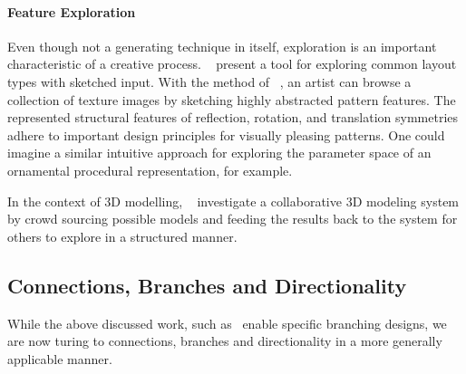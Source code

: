 \paragraph*{Feature Exploration}
\label{para:analysis_rulebased_exploration}

Even though not a generating technique in itself, exploration is an important characteristic of a creative process. \citeauthor*{todi_2016_sse}~\cite{todi_2016_sse} present a tool for exploring common layout types with sketched input. With the method of \citeauthor*{chen_2016_msi}~\cite{chen_2016_msi}, an artist can browse a collection of texture images by sketching highly abstracted pattern features. The represented structural features of reflection, rotation, and translation symmetries adhere to important design principles for visually pleasing patterns. One could imagine a similar intuitive approach for exploring the parameter space of an ornamental procedural representation, for example.

In the context of 3D modelling, \citeauthor*{talton_2009_emw}~\cite{talton_2009_emw} investigate a collaborative 3D modeling system by crowd sourcing possible models and feeding the results back to the system for others to explore in a structured manner. 

\subsection{Connections, Branches and Directionality}
\label{subsec:analysis_connections_branches_and_directionality}

While the above discussed work, such as~\cite{yu_2012_ans,xu_2009_mcc, merrell_2010_ecs} enable specific branching designs, we are now turing to connections, branches and directionality in a more generally applicable manner. 

